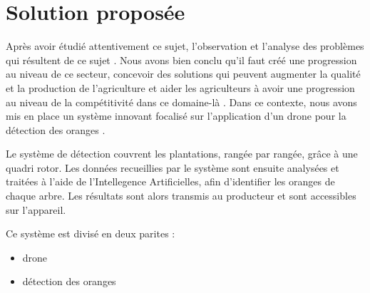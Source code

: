 \section{Solution proposée }
Après avoir étudié attentivement ce sujet, l'observation et l'analyse des problèmes qui résultent de ce sujet . Nous avons bien conclu qu'il faut créé une progression au niveau de ce secteur, concevoir des solutions qui peuvent augmenter la qualité et la production de l'agriculture et aider les agriculteurs à avoir une progression au niveau de la compétitivité dans ce domaine-là . Dans ce contexte, nous avons mis en place un système innovant focalisé sur l'application d'un drone pour la détection des oranges .


Le système de détection couvrent les plantations, rangée par rangée, grâce à une quadri rotor. Les données recueillies par le système sont ensuite analysées et traitées à l’aide de l’Intellegence Artificielles, afin d’identifier les oranges de chaque arbre. Les résultats sont alors transmis au producteur et sont accessibles sur l'appareil.


Ce système est divisé en deux parites :


\begin{itemize}
\item  drone 


\item détection des oranges
\end{itemize}